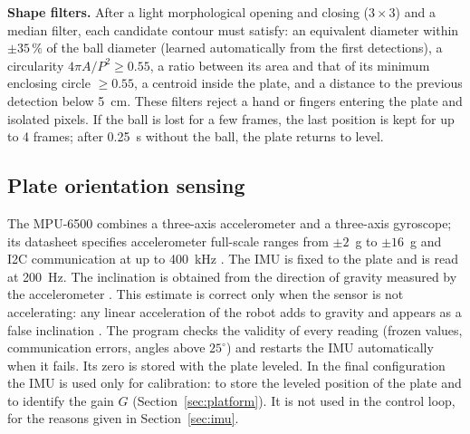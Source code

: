 \documentclass[11pt,letterpaper]{article}
\begin{document}
\textbf{Shape filters.} After a light morphological opening and closing
($3\times3$) and a median filter, each candidate contour must satisfy:
an equivalent diameter within $\pm35\,\%$ of the ball diameter (learned
automatically from the first detections), a circularity
$4\pi A/P^2 \geq 0.55$, a ratio between its area and that of its
minimum enclosing circle $\geq 0.55$, a centroid inside the plate, and
a distance to the previous detection below 5~cm. These filters reject a
hand or fingers entering the plate and isolated pixels. If the ball is
lost for a few frames, the last position is kept for up to 4 frames;
after 0.25~s without the ball, the plate returns to level.

\subsection{Plate orientation sensing}
The MPU-6500 combines a three-axis accelerometer and a three-axis
gyroscope; its datasheet specifies accelerometer full-scale ranges from
$\pm 2$~g to $\pm 16$~g and I2C communication at up to 400~kHz
\cite{MPU6500}. The IMU is fixed to the plate and is read at 200~Hz.
The inclination is obtained from the direction of gravity measured by
the accelerometer \cite{Pedley2013}. This estimate is correct only when
the sensor is not accelerating: any linear acceleration of the robot
adds to gravity and appears as a false inclination \cite{Pedley2013}.
The program checks the validity of every reading (frozen values,
communication errors, angles above $25^\circ$) and restarts the IMU
automatically when it fails. Its zero is stored with the plate leveled.
In the final configuration the IMU is used only for calibration: to
store the leveled position of the plate and to identify the gain $G$
(Section~\ref{sec:platform}). It is not used in the control loop, for
the reasons given in Section~\ref{sec:imu}.
\end{document}
